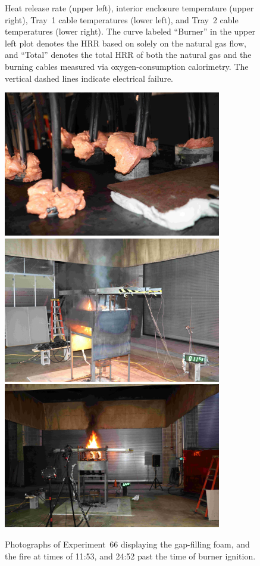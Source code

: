 \begin{figure}[H]
\caption[HRR and temperatures of Experiment 66]{Heat release rate (upper left), interior enclosure temperature (upper right), Tray~1 cable temperatures (lower left), and Tray~2 cable temperatures (lower right). The curve labeled ``Burner'' in the upper left plot denotes the HRR based on solely on the natural gas flow, and ``Total'' denotes the total HRR of both the natural gas and the burning cables measured via oxygen-consumption calorimetry. The vertical dashed lines indicate electrical failure.}
\label{fig:Test_66}
\end{figure}

\begin{figure}[p]
\centering
\includegraphics[height=2.50in]{../FIGURES/Test_66_Photo_1} \\ \vspace{0.1in}
\includegraphics[height=2.50in]{../FIGURES/Test_66_Photo_2} \\ \vspace{0.1in}
\includegraphics[height=2.50in]{../FIGURES/Test_66_Photo_3}
\caption[Photographs of Experiment~66]{Photographs of Experiment~66 displaying the gap-filling foam, and the fire at times of 11:53, and 24:52 past the time of burner ignition.}
\label{fig:Test_66_photos}
\end{figure}




